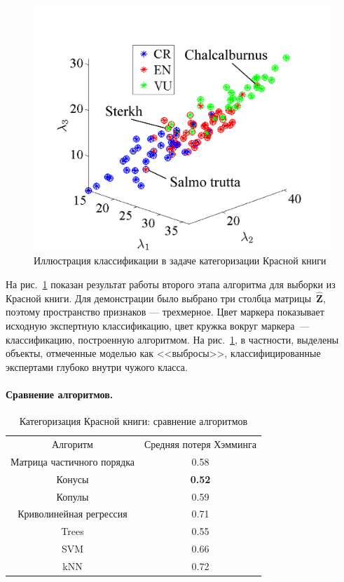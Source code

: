 \documentclass{elsarticle}
\newcommand{\bZ}{\mathbf{Z}}
\begin{document}
\begin{figure}
\begin{center}
\includegraphics[width=.6\textwidth]{y1.png}
\caption{Иллюстрация классификации в задаче категоризации Красной книги}
\label{figClass}
\end{center}
\end{figure}
На рис.~\ref{figClass} показан результат работы второго этапа алгоритма для выборки из Красной книги. Для демонстрации было выбрано три столбца матрицы~$\hat{\bZ}$, поэтому пространство признаков --- трехмерное. Цвет маркера показывает исходную экспертную классификацию, цвет кружка вокруг маркера~--- классификацию, построенную алгоритмом. На рис.~\ref{figClass}, в частности, выделены объекты, отмеченные моделью как <<выбросы>>, классифицированные экспертами глубоко внутри чужого класса.

\paragraph{Сравнение алгоритмов.}
\begin{table}
\begin{center}
\caption{Категоризация Красной книги: сравнение алгоритмов}
\begin{tabular}{|c|c|}
  \hline
  Алгоритм & Средняя потеря Хэмминга \\
  \hhline{=|=}
  Матрица частичного порядка & 0.58 \\
  \hline
  Конусы & \textbf{0.52} \\
  \hline
  Копулы & 0.59 \\
  \hline
  Криволинейная регрессия & 0.71 \\
\hline
  Trees & 0.55 \\
  \hline
  SVM &  0.66 \\
  \hline
  kNN & 0.72 \\
  \hline
\end{tabular}
\label{tab:AlgComparison}
\end{center}
\end{table}
\end{document}

